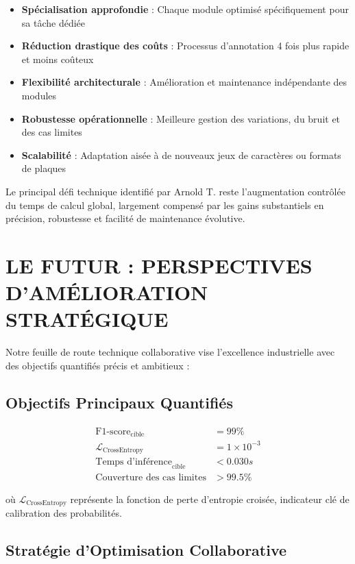 \documentclass[letterpaper, 10 pt, conference]{ieeeconf}
\begin{document}
\begin{itemize}
\item \textbf{Spécialisation approfondie} : Chaque module optimisé spécifiquement pour sa tâche dédiée
\item \textbf{Réduction drastique des coûts} : Processus d'annotation 4 fois plus rapide et moins coûteux
\item \textbf{Flexibilité architecturale} : Amélioration et maintenance indépendante des modules
\item \textbf{Robustesse opérationnelle} : Meilleure gestion des variations, du bruit et des cas limites
\item \textbf{Scalabilité} : Adaptation aisée à de nouveaux jeux de caractères ou formats de plaques
\end{itemize}

Le principal défi technique identifié par Arnold T. reste l'augmentation contrôlée du temps de calcul global, largement compensé par les gains substantiels en précision, robustesse et facilité de maintenance évolutive.

\section{LE FUTUR : PERSPECTIVES D'AMÉLIORATION STRATÉGIQUE}

Notre feuille de route technique collaborative vise l'excellence industrielle avec des objectifs quantifiés précis et ambitieux :

\subsection{Objectifs Principaux Quantifiés}

\begin{align}
\text{F1-score}_{\text{cible}} &= 99\% \\
\mathcal{L}_{\text{CrossEntropy}} &= 1 \times 10^{-3} \\
\text{Temps d'inférence}_{\text{cible}} &< 0.030s \\
\text{Couverture des cas limites} &> 99.5\%
\end{align}

où $\mathcal{L}_{\text{CrossEntropy}}$ représente la fonction de perte d'entropie croisée, indicateur clé de calibration des probabilités.

\subsection{Stratégie d'Optimisation Collaborative}
\end{document}
